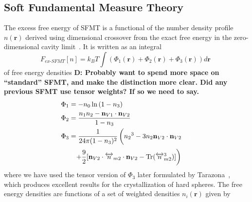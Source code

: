 \documentclass[letterpaper,twocolumn,amsmath,amssymb,prb]{revtex4-1}
\newcommand{\rr}{\textbf{r}}
\newcommand\davidsays[1]{{\bf \color{blue}D: #1}}
\begin{document}
\subsection{Soft Fundamental Measure Theory}

The excess free energy of SFMT is a functional of the number density 
profile $n(\textbf{r})$ derived using dimensional crossover from the exact 
free energy in the 
zero-dimensional cavity limit~\cite{schmidt1999density}.
It is written as an integral 
\begin{equation}
F_\textit{ex-SFMT}[n] = k_B T \int \left(\Phi_1(\rr) + \Phi_2(\rr) +
\Phi_3(\rr)\right) d\rr \; \label{eq:sfmt-excess-free}
\end{equation}
of free energy densities \davidsays{Probably want to spend more space on
``standard'' SFMT, and make the distinction more clear.  Did any previous SFMT
use tensor weights? If so we need to say.
}
\begin{align}
\Phi_1 &= -n_0 \ln\left( 1 - n_3\right)\\
\Phi_2 &= \frac{n_1 n_2 - \mathbf{n}_{V1}\cdot\mathbf{n}_{V2}}{1-n_3} \\
\Phi_3 &= \frac{1}{24\pi(1-n_3)^2}\left({n_2}^3-3n_2\mathbf{n}_{V2}
\cdot\mathbf{n}_{V2}\color{white}\frac{1}{1}\right)\color{black}
\label{eq:sfmt-phi3}
\end{align}
\begin{displaymath}\color{white}\left(\color{black}+\frac{9}{2}
[\mathbf{n}_{V2}\cdot{\overleftrightarrow{n}_{m2}}\cdot{\mathbf{n}_{V2}}-
\operatorname{Tr}({\overleftrightarrow{n}^3_{m2}})]\right)\end{displaymath}
where we have used the tensor version of $\Phi_3$ later formulated by 
Tarazona~\cite{tarazona2000,santos2012phi3}, which produces excellent
results for the crystallization of hard spheres.
The free energy densities are functions of a set of weighted densities $n_{i}(\textbf{r})$ 
given by %
\end{document}
